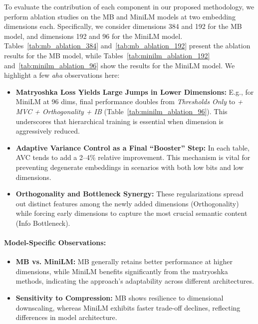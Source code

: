 To evaluate the contribution of each component in our proposed methodology, we perform ablation studies on the MB and MiniLM models at two embedding dimensions each. 
Specifically, we consider dimensions 384 and 192 for the MB model, and dimensions 192 and 96 for the MiniLM model. 
Tables~\ref{tab:mb_ablation_384} and~\ref{tab:mb_ablation_192} present the ablation results for the MB model, while Tables~\ref{tab:minilm_ablation_192} and~\ref{tab:minilm_ablation_96} show the results for the MiniLM model.
We highlight a few \emph{aha} observations here:
\begin{itemize}
    \item \textbf{Matryoshka Loss Yields Large Jumps in Lower Dimensions:} E.g., for MiniLM at 96 dims, final performance doubles from \textit{Thresholds Only} to \textit{+ MVC + Orthogonality + IB} (Table~\ref{tab:minilm_ablation_96}). This underscores that hierarchical training is essential when dimension is aggressively reduced.
    \item \textbf{Adaptive Variance Control as a Final “Booster” Step:} In each table, AVC tends to add a 2--4\% relative improvement. This mechanism is vital for preventing degenerate embeddings in scenarios with both low bits and low dimensions.
    \item \textbf{Orthogonality and Bottleneck Synergy:} These regularizations spread out distinct features among the newly added dimensions (Orthogonality) while forcing early dimensions to capture the most crucial semantic content (Info Bottleneck).
\end{itemize}

\paragraph{Model-Specific Observations:}
\begin{itemize}
    \item \textbf{MB vs. MiniLM:} MB generally retains better performance at higher dimensions, while MiniLM benefits significantly from the matryoshka methods, indicating the approach's adaptability across different architectures.
    \item \textbf{Sensitivity to Compression:} MB shows resilience to dimensional downscaling, whereas MiniLM exhibits faster trade-off declines, reflecting differences in model architecture.
\end{itemize}

